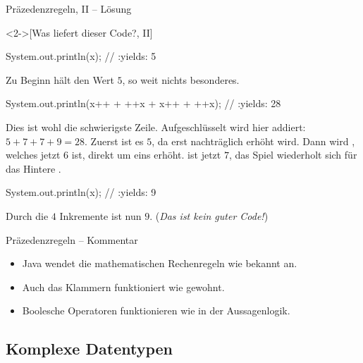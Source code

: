 \begin{frame}[fragile,c]{Präzedenzregeln, II -- Lösung}
    \begin{solve}<2->[Was liefert dieser Code?, II]
        \pause{}\begin{plainjava}[columns={[c]fullflexible}]
System.out.println(x); // :yields: 5
        \end{plainjava}
        \pause{}Zu Beginn hält  den Wert \(5\), so weit nichts besonderes.
        \begin{plainjava}[columns={[c]fullflexible}]
System.out.println(x++ + ++x + x++ + ++x); // :yields: 28
        \end{plainjava}
        \pause{}Dies ist wohl die schwierigste Zeile.\pause{} Aufgeschlüsselt wird hier addiert: \(5 + 7 + 7 + 9 = 28\).\pause{} Zuerst ist es \(5\), da  erst nachträglich erhöht wird.\pause{} Dann wird , welches jetzt \(6\) ist, direkt um eins erhöht.\pause{}  ist jetzt \(7\), das Spiel wiederholt sich für das Hintere .\pause{}
        \begin{plainjava}[columns={[c]fullflexible}]
System.out.println(x); // :yields: 9
        \end{plainjava}
        \pause{}Durch die \(4\) Inkremente ist  nun \(9\).\pause{} (\textit{Das ist \emph{kein} guter Code!})
    \end{solve}
\end{frame}
\fi

\begin{frame}{Präzedenzregeln -- Kommentar}
    \begin{itemize}[<+(1)->]
        \widei
        \item Java wendet die mathematischen Rechenregeln wie bekannt an.
        \item Auch das Klammern funktioniert wie gewohnt.
        \item Boolesche Operatoren funktionieren wie in der Aussagenlogik.
    \end{itemize}
\end{frame}

\subsection{Komplexe Datentypen}

